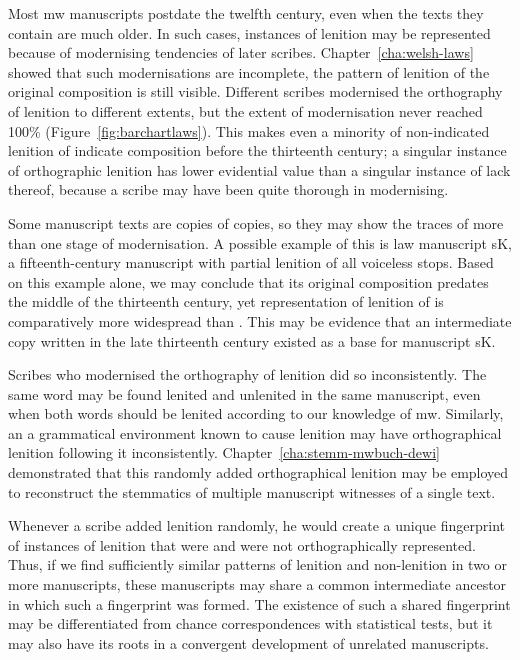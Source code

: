 Most \gls{mw} manuscripts postdate the twelfth century, even when the texts they contain are much older. In such cases, instances of lenition may be represented because of modernising tendencies of later scribes. Chapter~\ref{cha:welsh-laws} showed  that such modernisations are incomplete, \ie the pattern of lenition of the original composition is still visible. Different scribes  modernised the orthography of lenition to different extents, but the extent of modernisation never reached 100\% (Figure~\ref{fig:barchartlaws}). This makes even a minority of non-indicated lenition of  indicate composition before the thirteenth century; a singular instance of orthographic lenition has lower evidential value than a singular instance of lack thereof, because a scribe may have been quite thorough in modernising.

Some manuscript texts are copies of copies, so they may show the traces of more than one stage of modernisation. A possible example of this is law manuscript \gls{sK}, a fifteenth-century manuscript with partial lenition of all voiceless stops. Based on this example alone, we may conclude that its original composition predates the middle of the thirteenth century, yet representation of lenition of  is comparatively more widespread than . This may be evidence that an intermediate copy written in the late thirteenth century existed as a base for manuscript \gls{sK}.

Scribes who modernised the orthography of lenition did so inconsistently. The same word may be found lenited and unlenited in the same manuscript, even when both words should be lenited according to our knowledge of \gls{mw}. Similarly, an a grammatical environment known to cause lenition may have orthographical lenition following it inconsistently. Chapter~\ref{cha:stemm-mwbuch-dewi} demonstrated that this randomly added orthographical lenition may be employed to reconstruct the stemmatics of multiple manuscript witnesses of a single text.

Whenever a scribe added lenition randomly, he would create a unique fingerprint of instances of lenition that were and were not orthographically represented. Thus, if we find sufficiently similar patterns of lenition and non-lenition in two or more manuscripts, these manuscripts may share a common intermediate ancestor in which such a fingerprint was formed. The existence of such a shared fingerprint may be differentiated from chance correspondences with statistical tests, but it may also have its roots in a convergent development of  unrelated manuscripts.

